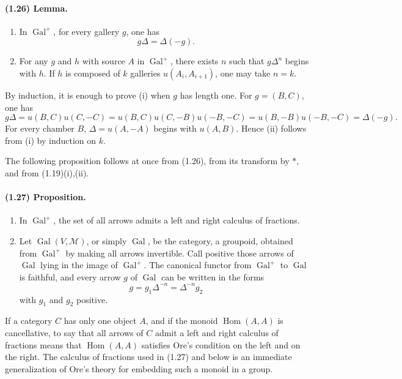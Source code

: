 \documentclass[10pt]{article}
\begin{document}
\paragraph{(1.26) Lemma.}
\begin{enumerate}[label=(\roman*)]
\item In \(\operatorname{Gal}^+\), for every gallery \(g\), one has
\[
g\Delta=\Delta(-g).
\]
\item For any \(g\) and \(h\) with source \(A\) in \(\operatorname{Gal}^+\), there exists \(n\) such that \(g\Delta^n\) begins with \(h\). If \(h\) is composed of \(k\) galleries \(u(A_i,A_{i+1})\), one may take \(n=k\).
\end{enumerate}

By induction, it is enough to prove (i) when \(g\) has length one. For \(g=(B,C)\), one has
\[
g\Delta=u(B,C)u(C,-C)=u(B,C)u(C,-B)u(-B,-C)
=u(B,-B)u(-B,-C)=\Delta(-g).
\]
For every chamber \(B\), \(\Delta=u(A,-A)\) begins with \(u(A,B)\). Hence (ii) follows from (i) by induction on \(k\).

The following proposition follows at once from (1.26), from its transform by \(*\), and from (1.19)(i),(ii).

\paragraph{(1.27) Proposition.}
\begin{enumerate}[label=(\roman*)]
\item In \(\operatorname{Gal}^+\), the set of all arrows admits a left and right calculus of fractions.
\item Let \(\operatorname{Gal}(V,\mathcal M)\), or simply \(\operatorname{Gal}\), be the category, a groupoid, obtained from \(\operatorname{Gal}^+\) by making all arrows invertible. Call positive those arrows of \(\operatorname{Gal}\) lying in the image of \(\operatorname{Gal}^+\). The canonical functor from \(\operatorname{Gal}^+\) to \(\operatorname{Gal}\) is faithful, and every arrow \(g\) of \(\operatorname{Gal}\) can be written in the forms
\[
g=g_1\Delta^{-n}=\Delta^{-n}g_2
\]
with \(g_1\) and \(g_2\) positive.
\end{enumerate}

If a category \(C\) has only one object \(A\), and if the monoid \(\operatorname{Hom}(A,A)\) is cancellative, to say that all arrows of \(C\) admit a left and right calculus of fractions means that \(\operatorname{Hom}(A,A)\) satisfies Ore's condition on the left and on the right. The calculus of fractions used in (1.27) and below is an immediate generalization of Ore's theory for embedding such a monoid in a group.
\end{document}
